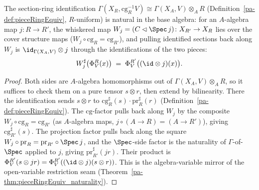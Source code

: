 \begin{theorem}
  \label{pa-thm:pieceRingEquiv_whiskerLeft_naturality}
  \leanok

  The section-ring identification \(\Gamma(X_R, \mathrm{cg}_R^{-1}V) \cong \Gamma(X_A, V)
  \otimes_A R\) (Definition~\ref{pa-def:pieceRingEquiv}, \(R\)-uniform) is natural in the base algebra:
  for an \(A\)-algebra map \(j \colon R \to R'\), the whiskered map \(W_j = (C \lhd \Spec\, j) \colon
  X_{R'} \to X_R\) lies over the cover structure maps (\(W_j \circ \mathrm{cg}_R = \mathrm{cg}_{R'}\)),
  and pulling identified sections back along \(W_j\) is \(\id_{\Gamma(X_A, V)} \otimes j\) through the
  identifications of the two pieces:
  \[
    W_j^{\sharp}\bigl(\Phi^R_V(x)\bigr) \;=\; \Phi^{R'}_V\bigl((\id \otimes j)(x)\bigr) .
  \]
\end{theorem}
\begin{proof}
  \leanok
  Both sides are \(A\)-algebra homomorphisms out of \(\Gamma(X_A, V) \otimes_A R\), so it suffices to
  check them on a pure tensor \(s \otimes r\), then extend by bilinearity. There the identification
  sends \(s \otimes r\) to \(\mathrm{cg}_R^{\sharp}(s) \cdot \mathrm{pr}_R^{\sharp}(r)\)
  (Definition~\ref{pa-def:pieceRingEquiv}). The \(\mathrm{cg}\)-factor pulls back along \(W_j\) by the
  composite \(W_j \circ \mathrm{cg}_R = \mathrm{cg}_{R'}\) (as \(A\)-algebra maps, \(j \circ (A \to R)
  = (A \to R')\)), giving \(\mathrm{cg}_{R'}^{\sharp}(s)\). The projection factor pulls back along the
  square \(W_j \circ \mathrm{pr}_R = \mathrm{pr}_{R'} \circ \Spec\, j\), and the \(\Spec\)-side factor
  is the naturality of \(\Gamma\)-of-\(\Spec\) applied to \(j\), giving \(\mathrm{pr}_{R'}^{\sharp}(j
  r)\). Their product is \(\Phi^{R'}_V(s \otimes j r) = \Phi^{R'}_V((\id \otimes j)(s \otimes r))\).
  This is the algebra-variable mirror of the open-variable restriction seam
  (Theorem~\ref{pa-thm:pieceRingEquiv_naturality}).
\end{proof}

